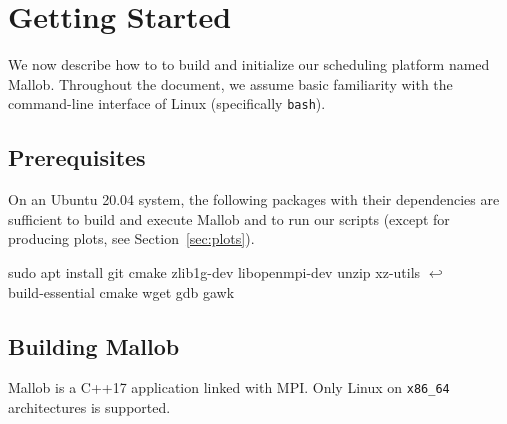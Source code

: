 \documentclass[runningheads]{article}
\newcommand{\CR}{{\tiny$\hookleftarrow$}}
\numberwithin{dummy}{subsection}
\begin{document}
\section{Getting Started}

We now describe how to to build and initialize our scheduling platform named Mallob.
Throughout the document, we assume basic familiarity with the command-line interface of Linux (specifically \texttt{bash}).

\subsection{Prerequisites}
\label{sec:prerequisites}

On an Ubuntu 20.04 system, the following packages with their dependencies are sufficient to build and execute Mallob and to run our scripts (except for producing plots, see Section~\ref{sec:plots}).

\begin{ttfenv}
sudo apt install git cmake zlib1g-dev libopenmpi-dev unzip xz-utils \CR\\
build-essential cmake wget gdb gawk
\end{ttfenv}






\subsection{Building Mallob}

Mallob is a C++17 application linked with MPI. Only Linux on \texttt{x86\_64} architectures is supported.
\end{document}
